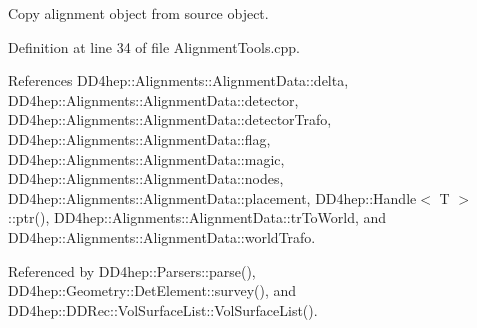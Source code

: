 Copy alignment object from source object. 

Definition at line 34 of file AlignmentTools.cpp.

References DD4hep::Alignments::AlignmentData::delta, DD4hep::Alignments::AlignmentData::detector, DD4hep::Alignments::AlignmentData::detectorTrafo, DD4hep::Alignments::AlignmentData::flag, DD4hep::Alignments::AlignmentData::magic, DD4hep::Alignments::AlignmentData::nodes, DD4hep::Alignments::AlignmentData::placement, DD4hep::Handle$<$ T $>$::ptr(), DD4hep::Alignments::AlignmentData::trToWorld, and DD4hep::Alignments::AlignmentData::worldTrafo.

Referenced by DD4hep::Parsers::parse(), DD4hep::Geometry::DetElement::survey(), and DD4hep::DDRec::VolSurfaceList::VolSurfaceList().